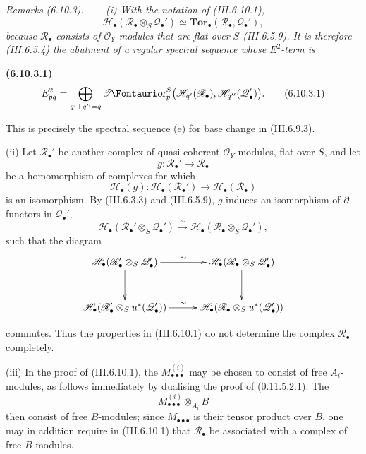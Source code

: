 \documentclass[10pt,oneside]{book}
\newcommand{\sh}[1]{\mathscr{#1}}
\newcommand{\shTor}{\sh{T}\textup{\kern-2.2pt{\Fontauri\slshape or}}}
\newcommand{\sref}[2][]{(#2)}
\newcommand{\oldpage}[2][]{\setcounter{footnote}{0}\marginpar{\scriptsize\textbf{#1}~|~#2}\ignorespaces}
\newenvironment{env}[1][]{\par\medskip\noindent\textbf{(#1)}\ }{\par}
\newenvironment{remarks}[1][]{\par\medskip\noindent\itshape Remarks (#1). ---\ }{\par}
\begin{document}
\begin{remarks}[6.10.3]
\label{III.6.10.3}
\textnormal{(i)}
With the notation of \sref{III.6.10.1},
\[
  \sh H_\bullet
  (\sh R_\bullet\otimes_S\sh Q_\bullet')
  \simeq
  \mathbf{Tor}_\bullet(\sh R_\bullet,\sh Q_\bullet'),
\]
because $\sh R_\bullet$ consists of $\sh O_Y$-modules that are
flat over $S$ \sref{III.6.5.9}.  It is therefore
\sref{III.6.5.4} the abutment of a regular spectral sequence
whose $E^2$-term is
\begin{env}[6.10.3.1]
\label{III.6.10.3.1}
\[
  E^2_{pq}
  =
  \bigoplus_{q'+q''=q}
  \shTor_p^S
  \bigl(
    \sh H_{q'}(\sh R_\bullet),
    \sh H_{q''}(\sh Q_\bullet')
  \bigr).
  \tag{6.10.3.1}\label{III.6.10.3.1.eq}
\]
\end{env}
This is precisely the spectral sequence (e) for base change in
\sref{III.6.9.3}.

\medskip
\textnormal{(ii)}
Let $\sh R_\bullet'$ be another complex of quasi-coherent
$\sh O_Y$-modules, flat over $S$, and let
\[
  g:\sh R_\bullet'\longrightarrow\sh R_\bullet
\]
be a homomorphism of complexes for which
\[
  \sh H_\bullet(g):
  \sh H_\bullet(\sh R_\bullet')
  \longrightarrow
  \sh H_\bullet(\sh R_\bullet)
\]
is an isomorphism.  By \sref{III.6.3.3} and
\sref{III.6.5.9}, $g$ induces an isomorphism of
$\partial$-functors in $\sh Q_\bullet'$,
\[
  \sh H_\bullet
  (\sh R_\bullet'\otimes_S\sh Q_\bullet')
  \xrightarrow{\sim}
  \sh H_\bullet
  (\sh R_\bullet\otimes_S\sh Q_\bullet'),
\]
such that the diagram
\[
\xymatrix@C=28pt@R=30pt{
  \sh H_\bullet
  (\sh R_\bullet'\otimes_S\sh Q_\bullet')
  \ar[r]^-{\sim}\ar[d]
  &
  \sh H_\bullet
  (\sh R_\bullet\otimes_S\sh Q_\bullet')
  \ar[d]
  \\
  \sh H_\bullet
  (\sh R_\bullet'\otimes_Su^*(\sh Q_\bullet'))
  \ar[r]^-{\sim}
  &
  \sh H_\bullet
  (\sh R_\bullet\otimes_Su^*(\sh Q_\bullet'))
}
\]
\par\medskip\noindent
commutes.  Thus the properties in \sref{III.6.10.1} do not
determine the complex $\sh R_\bullet$ completely.

\medskip
\oldpage[III]{173}
\textnormal{(iii)}
In the proof of \sref{III.6.10.1}, the
$M_{\bullet\bullet\bullet}^{(i)}$ may be chosen to consist of
free $A_i$-modules, as follows immediately by dualising the
proof of \sref[0]{0.11.5.2.1}.  The
\[
  M_{\bullet\bullet\bullet}^{(i)}\otimes_{A_i}B
\]
then consist of free $B$-modules; since
$M_{\bullet\bullet\bullet}$ is their tensor product over $B$,
one may in addition require in \sref{III.6.10.1} that
$\sh R_\bullet$ be associated with a complex of free
$B$-modules.


\end{remarks}
\end{document}
